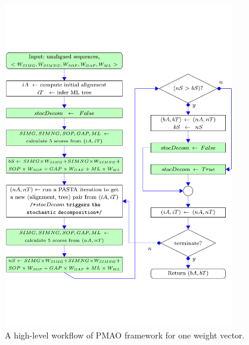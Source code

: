 \begin{figure}[!htbp]
	\centering
	\includegraphics[width=0.9\textwidth]{pmao-flow}
	\caption{A high-level workflow of PMAO framework for one weight vector.}
	\label{fig:PMAO:flow}
\end{figure}

